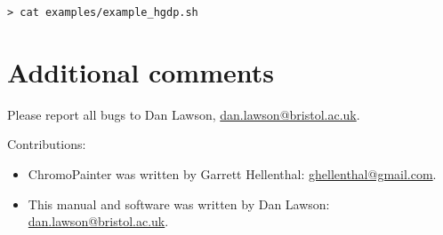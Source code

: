 \documentclass[11pt]{article}
\begin{document}
\begin{lstlisting}[caption=example3: HGDP download and processing.]
> cat examples/example_hgdp.sh
\end{lstlisting}



\section{Additional comments}

Please report all bugs to Dan Lawson, \href{mailto:dan.lawson@bristol.ac.uk}{dan.lawson@bristol.ac.uk}.

Contributions:
\begin{itemize}
\item ChromoPainter was written by Garrett Hellenthal:  \href{mailto:ghellenthal@gmail.com}{ghellenthal@gmail.com}.
\item This manual and software was written by Dan Lawson: \href{mailto:dan.lawson@bristol.ac.uk}{dan.lawson@bristol.ac.uk}.
\end{itemize}
\end{document}
